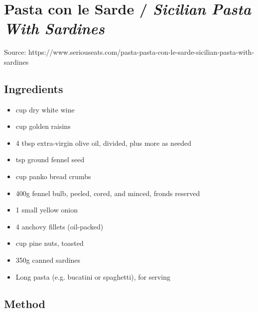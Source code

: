 \clearpage
\section{Pasta con le Sarde / \emph{Sicilian Pasta With Sardines}}


Source: https://www.seriouseats.com/pasta-pasta-con-le-sarde-sicilian-pasta-with-sardines

\subsection{Ingredients}

\begin{itemize}
    \item {} cup dry white wine
    \item {} cup golden raisins
    \item 4 tbsp extra-virgin olive oil, divided, plus more as needed
    \item {} tsp ground fennel seed
    \item {} cup panko bread crumbs
    \item 400g fennel bulb, peeled, cored, and minced, fronds reserved
    \item 1 small yellow onion
    \item 4 anchovy fillets (oil-packed)
    \item {} cup pine nuts, toasted
    \item 350g canned sardines
    \item Long pasta (e.g. bucatini or spaghetti), for serving
\end{itemize}

\subsection{Method}


